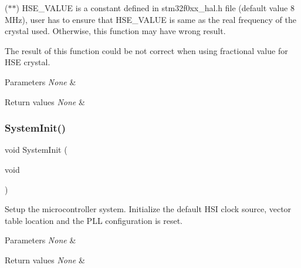 ($\ast$$\ast$) H\+S\+E\+\_\+\+V\+A\+L\+UE is a constant defined in stm32f0xx\+\_\+hal.\+h file (default value 8 M\+Hz), user has to ensure that H\+S\+E\+\_\+\+V\+A\+L\+UE is same as the real frequency of the crystal used. Otherwise, this function may have wrong result.


\begin{DoxyItemize}
\item The result of this function could be not correct when using fractional value for H\+SE crystal.
\end{DoxyItemize}


\begin{DoxyParams}{Parameters}
{\em None} & \\
\hline
\end{DoxyParams}

\begin{DoxyRetVals}{Return values}
{\em None} & \\
\hline
\end{DoxyRetVals}
\mbox{\label{group___s_t_m32_f0xx___system___private___functions_ga93f514700ccf00d08dbdcff7f1224eb2}} 
\subsubsection{\texorpdfstring{System\+Init()}{SystemInit()}}
{\footnotesize\ttfamily void System\+Init (\begin{DoxyParamCaption}\item[{void}]{ }\end{DoxyParamCaption})}



Setup the microcontroller system. Initialize the default H\+SI clock source, vector table location and the P\+LL configuration is reset. 


\begin{DoxyParams}{Parameters}
{\em None} & \\
\hline
\end{DoxyParams}

\begin{DoxyRetVals}{Return values}
{\em None} & \\
\hline
\end{DoxyRetVals}
